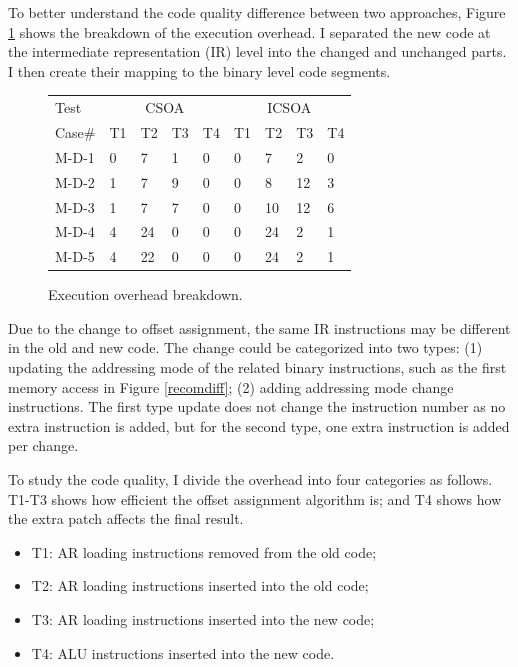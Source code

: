 To better understand the code quality difference between two approaches, Figure \ref{exebreakdown} shows the breakdown 
of the execution overhead. I separated the new code at the intermediate representation (IR) level into the changed and 
unchanged parts. I then create their mapping to the binary level code segments.


\begin{figure}[htdp]
\begin{small}

\begin{center}
\begin{tabular}{|p{0.5in}|p{0.2in}p{0.2in}p{0.2in}p{0.2in}|p{0.2in}p{0.2in}p{0.2in}p{0.2in}|}
\hline 
Test &\multicolumn{4}{c|}{CSOA} & \multicolumn{4}{c|}{ICSOA} \\
Case\# & T1 & T2 & T3 & T4 & T1 & T2 & T3 & T4\\
\hline \hline
M-D-1	&0	&7	&1	&0	&0	&7	&2	&0	\\
								
M-D-2	&1	&7	&9	&0	&0	&8	&12	&3	\\
									
M-D-3	&1	&7	&7	&0	&0	&10	&12	&6	\\
									
M-D-4	&4	&24	&0	&0	&0	&24	&2	&1	\\
									
M-D-5	&4	&22	&0	&0	&0	&24	&2	&1	\\

\hline

\end{tabular}
\end{center}
\caption{Execution overhead breakdown.}
\label{exebreakdown}
\end{small}
\vspace{-0.1in}
\end{figure}


Due to the change to offset assignment, the same IR instructions may be different in the old and new code. The change 
could be categorized into two types: (1) updating the addressing mode of the related binary instructions, such as the 
first memory access in Figure \ref{recomdiff}; (2) adding addressing mode change instructions. The first type update 
does not change the instruction number as no extra instruction is added,
but for the second type, one extra instruction is added per change. 

To study the code quality, I divide the overhead into four categories as follows. T1-T3 shows how efficient the offset 
assignment algorithm is; and T4 shows how the extra patch affects the final result.
\begin{itemize}
\item T1: AR loading instructions removed from the old code;
\item T2: AR loading instructions inserted into the old code;
\item T3: AR loading instructions inserted into the new code;
\item T4: ALU instructions inserted into the new code.
\end{itemize}

